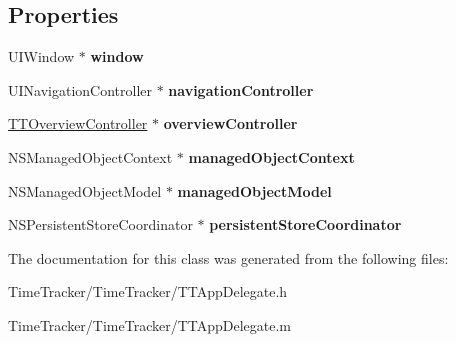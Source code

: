 \subsection*{Properties}
\begin{DoxyCompactItemize}
\item 
\hypertarget{interface_t_t_app_delegate_afee961deef1ef0200e118db8df250882}{U\-I\-Window $\ast$ {\bfseries window}}\label{interface_t_t_app_delegate_afee961deef1ef0200e118db8df250882}

\item 
\hypertarget{interface_t_t_app_delegate_a29280ffad6216a1a750c81049cf66367}{U\-I\-Navigation\-Controller $\ast$ {\bfseries navigation\-Controller}}\label{interface_t_t_app_delegate_a29280ffad6216a1a750c81049cf66367}

\item 
\hypertarget{interface_t_t_app_delegate_a2dba5964853445e01380042ea528e874}{\hyperlink{interface_t_t_overview_controller}{T\-T\-Overview\-Controller} $\ast$ {\bfseries overview\-Controller}}\label{interface_t_t_app_delegate_a2dba5964853445e01380042ea528e874}

\item 
\hypertarget{interface_t_t_app_delegate_a5ba2cbdc1a3a311fa3974cb831b1bc04}{N\-S\-Managed\-Object\-Context $\ast$ {\bfseries managed\-Object\-Context}}\label{interface_t_t_app_delegate_a5ba2cbdc1a3a311fa3974cb831b1bc04}

\item 
\hypertarget{interface_t_t_app_delegate_abf1c591e298f0df128e2bd8b467dda84}{N\-S\-Managed\-Object\-Model $\ast$ {\bfseries managed\-Object\-Model}}\label{interface_t_t_app_delegate_abf1c591e298f0df128e2bd8b467dda84}

\item 
\hypertarget{interface_t_t_app_delegate_a2b720bca6c20ed2cbfe2529a67c03342}{N\-S\-Persistent\-Store\-Coordinator $\ast$ {\bfseries persistent\-Store\-Coordinator}}\label{interface_t_t_app_delegate_a2b720bca6c20ed2cbfe2529a67c03342}

\end{DoxyCompactItemize}


The documentation for this class was generated from the following files\-:\begin{DoxyCompactItemize}
\item 
Time\-Tracker/\-Time\-Tracker/T\-T\-App\-Delegate.\-h\item 
Time\-Tracker/\-Time\-Tracker/T\-T\-App\-Delegate.\-m\end{DoxyCompactItemize}
